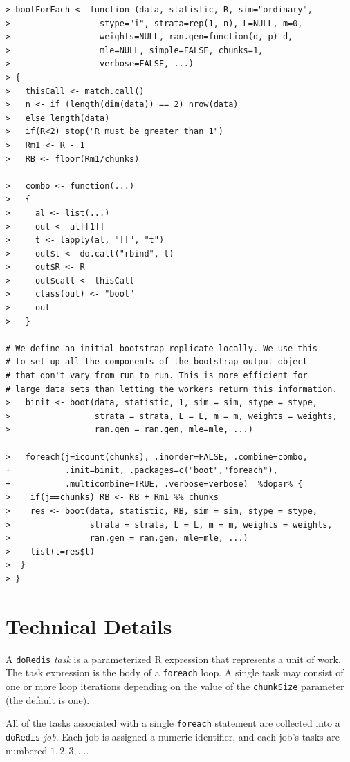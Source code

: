 \documentclass[12pt]{article}
\begin{document}
\begin{lstlisting}[float=!ht,caption=Parallel boot Function,basicstyle=\footnotesize\ttfamily,label=bootforeach]
> bootForEach <- function (data, statistic, R, sim="ordinary",
>                  stype="i", strata=rep(1, n), L=NULL, m=0,
>                  weights=NULL, ran.gen=function(d, p) d,
>                  mle=NULL, simple=FALSE, chunks=1,
>                  verbose=FALSE, ...)
> {
>   thisCall <- match.call()
>   n <- if (length(dim(data)) == 2) nrow(data)
>   else length(data)
>   if(R<2) stop("R must be greater than 1")
>   Rm1 <- R - 1
>   RB <- floor(Rm1/chunks)

>   combo <- function(...)
>   {
>     al <- list(...)
>     out <- al[[1]]
>     t <- lapply(al, "[[", "t")
>     out$t <- do.call("rbind", t)
>     out$R <- R
>     out$call <- thisCall
>     class(out) <- "boot"
>     out
>   }
  
# We define an initial bootstrap replicate locally. We use this
# to set up all the components of the bootstrap output object
# that don't vary from run to run. This is more efficient for
# large data sets than letting the workers return this information.
>   binit <- boot(data, statistic, 1, sim = sim, stype = stype, 
>                 strata = strata, L = L, m = m, weights = weights,
>                 ran.gen = ran.gen, mle=mle, ...)
  
>   foreach(j=icount(chunks), .inorder=FALSE, .combine=combo,
+           .init=binit, .packages=c("boot","foreach"),
+           .multicombine=TRUE, .verbose=verbose)  %dopar% {
>    if(j==chunks) RB <- RB + Rm1 %% chunks
>    res <- boot(data, statistic, RB, sim = sim, stype = stype,
>                strata = strata, L = L, m = m, weights = weights,
>                ran.gen = ran.gen, mle=mle, ...)
>    list(t=res$t)
>  }
> }
\end{lstlisting}


\section{Technical Details}

A \verb+doRedis+ \emph{task} is a parameterized R expression that represents
a unit of work. The task expression is the body of a \verb+foreach+ loop. A
single task may consist of one or more loop iterations depending on the value
of the \verb+chunkSize+ parameter (the default is one).

All of the tasks associated with a single \verb+foreach+ statement are
collected into a \verb+doRedis+ \emph{job}. Each job is assigned a numeric
identifier, and each job's tasks are numbered $1, 2, 3, ...$.
\end{document}

